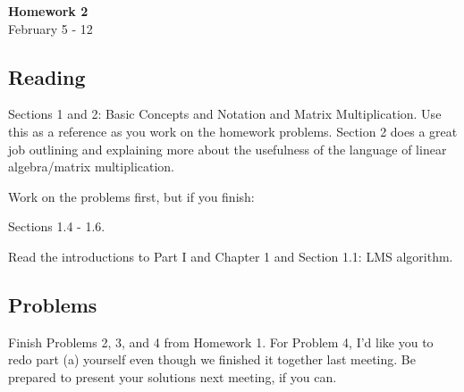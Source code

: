 \documentclass{article}
\newenvironment{envsection}[1]{\begin{trivlist}
\item[\hskip \labelsep {\bfseries #1}]}{\end{trivlist}}
\begin{document}
\setlength{\abovedisplayskip}{4pt}
\setlength{\belowdisplayskip}{4pt}


\begin{center}
    \Large{\textbf{Homework 2}}\\
    \normalsize February 5 - 12
\end{center}
\vspace{10pt}

\subsection*{Reading}

\begin{envsection}{1. CS229 Linear Algebra Reference:}
    Sections 1 and 2: Basic Concepts and Notation and Matrix Multiplication. Use this as a reference as you work on the homework problems. Section 2 does a great job outlining and explaining more about the usefulness of the language of linear algebra/matrix multiplication.
\end{envsection}

\noindent Work on the problems first, but if you finish:

\begin{envsection}{2. Rogers and Girolami:}
    Sections 1.4 - 1.6.
\end{envsection}

\begin{envsection}{3. CS229 Notes:}
    Read the introductions to Part I and Chapter 1 and Section 1.1: LMS algorithm.
\end{envsection}

\subsection*{Problems}

Finish Problems 2, 3, and 4 from Homework 1. For Problem 4, I'd like you to redo part (a) yourself even though we finished it together last meeting. Be prepared to present your solutions next meeting, if you can.
\end{document}
